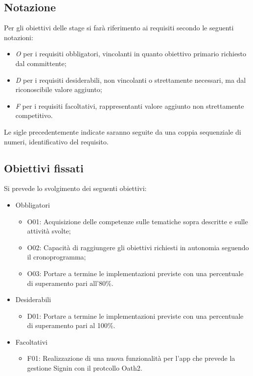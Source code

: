 \subsection*{Notazione}
Per gli obiettivi delle stage si farà riferimento ai requisiti secondo le seguenti notazioni:
\begin{itemize}
	\item \textit{O} per i requisiti obbligatori, vincolanti in quanto obiettivo primario richiesto dal committente;
	\item \textit{D} per i requisiti desiderabili, non vincolanti o strettamente necessari,
	ma dal riconoscibile valore aggiunto;
	\item \textit{F} per i requisiti facoltativi, rappresentanti valore aggiunto non strettamente 
	competitivo.
\end{itemize}

Le sigle precedentemente indicate saranno seguite da una coppia sequenziale di numeri, identificativo del requisito.

\subsection*{Obiettivi fissati}
Si prevede lo svolgimento dei seguenti obiettivi:
\begin{itemize}
	\item Obbligatori
	\begin{itemize}
		\item	O01: Acquisizione delle competenze sulle tematiche sopra descritte e sulle attività svolte; \\
		\item O02: Capacità di raggiungere gli obiettivi richiesti in autonomia seguendo il cronoprogramma;\\
		\item O03: Portare a termine le implementazioni previste con una percentuale di superamento pari all’80\%.\\
	\end{itemize}
	
	\item Desiderabili 
	\begin{itemize}
		\item D01: Portare a termine le implementazioni previste con una percentuale di superamento pari al 100\%.\\
	\end{itemize}
	
	\item Facoltativi
	\begin{itemize}
		\item F01:  Realizzazione di una nuova funzionalità per l'app che prevede la gestione Signin con il protcollo Oath2.\\
	\end{itemize} 
\end{itemize}

